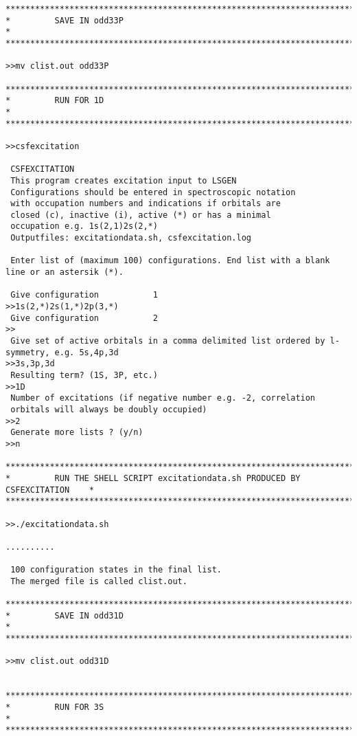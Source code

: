\documentclass[fleqn,10pt]{book}
\begin{document}
\begin{verbatim}
*******************************************************************************
*         SAVE IN odd33P                                                     *
*******************************************************************************

>>mv clist.out odd33P

*******************************************************************************
*         RUN FOR 1D                                                          *
*******************************************************************************

>>csfexcitation

 CSFEXCITATION
 This program creates excitation input to LSGEN
 Configurations should be entered in spectroscopic notation
 with occupation numbers and indications if orbitals are
 closed (c), inactive (i), active (*) or has a minimal
 occupation e.g. 1s(2,1)2s(2,*)
 Outputfiles: excitationdata.sh, csfexcitation.log

 Enter list of (maximum 100) configurations. End list with a blank line or an astersik (*).

 Give configuration           1
>>1s(2,*)2s(1,*)2p(3,*)
 Give configuration           2
>>
 Give set of active orbitals in a comma delimited list ordered by l-symmetry, e.g. 5s,4p,3d
>>3s,3p,3d
 Resulting term? (1S, 3P, etc.)
>>1D
 Number of excitations (if negative number e.g. -2, correlation 
 orbitals will always be doubly occupied)                        
>>2
 Generate more lists ? (y/n)
>>n

*******************************************************************************
*         RUN THE SHELL SCRIPT excitationdata.sh PRODUCED BY CSFEXCITATION    *
*******************************************************************************

>>./excitationdata.sh

..........

 100 configuration states in the final list.
 The merged file is called clist.out.

*******************************************************************************
*         SAVE IN odd31D                                                     *
*******************************************************************************

>>mv clist.out odd31D


*******************************************************************************
*         RUN FOR 3S                                                          *
*******************************************************************************


\end{verbatim}
\end{document}
